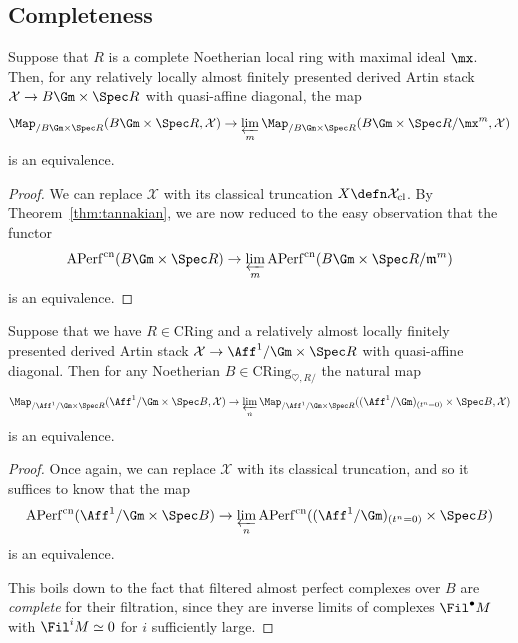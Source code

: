 \documentclass[10pt]{amsart}
\begin{document}
\subsection{Completeness}

\begin{proposition}
\label{prop:BGm_complete}
Suppose that $R$ is a complete Noetherian local ring with maximal ideal $\mx$. Then, for any relatively locally almost finitely presented derived Artin stack $\mathcal{X}\to B\Gm\times \Spec R$ with quasi-affine diagonal, the map
\[
\Map_{/B\Gm\times\Spec R}(B\Gm\times\Spec R,\mathcal{X})\to \varprojlim_m \Map_{/B\Gm\times\Spec R}(B\Gm\times\Spec R/\mx^m,\mathcal{X})
\]
is an equivalence.
\end{proposition}
\begin{proof}
We can replace $\mathcal{X}$ with its classical truncation $X \defn \mathcal{X}_{\mathrm{cl}}$. By Theorem~\ref{thm:tannakian}, we are now reduced to the easy observation that the functor
\[
\mathrm{APerf}^{\mathrm{cn}}(B\Gm\times \Spec R)\to \varprojlim_m\mathrm{APerf}^{\mathrm{cn}}(B\Gm\times \Spec R/\mathfrak{m}^m)
\]
is an equivalence.
\end{proof} 

\begin{proposition}
\label{prop:A1Gm_complete}
Suppose that we have $R\in \mathrm{CRing}$ and a relatively almost locally finitely presented derived Artin stack $\mathcal{X}\to \Aff^1/\Gm\times \Spec R$ with quasi-affine diagonal. Then for any Noetherian $B\in \mathrm{CRing}_{\heartsuit,R/}$ the natural map
\[
\Map_{/\Aff^1/\Gm\times \Spec R}(\Aff^1/\Gm \times \Spec B,\mathcal{X})\to\varprojlim_n\Map_{/\Aff^1/\Gm\times \Spec R}((\Aff^1/\Gm)_{(t^n=0)} \times \Spec B,\mathcal{X})
\]
is an equivalence.
\end{proposition}
\begin{proof}
Once again, we can replace $\mathcal{X}$ with its classical truncation, and so it suffices to know that the map
\[
\mathrm{APerf}^{\mathrm{cn}}(\Aff^1/\Gm\times \Spec B)\to \varprojlim_n\mathrm{APerf}^{\mathrm{cn}}((\Aff^1/\Gm)_{(t^n = 0)}\times \Spec B)
\]
is an equivalence. 

This boils down to the fact that filtered almost perfect complexes over $B$ are \emph{complete} for their filtration, since they are inverse limits of complexes $\Fil^\bullet M$ with $\Fil^iM \simeq 0$ for $i$ sufficiently large.
\end{proof}
\end{document}
